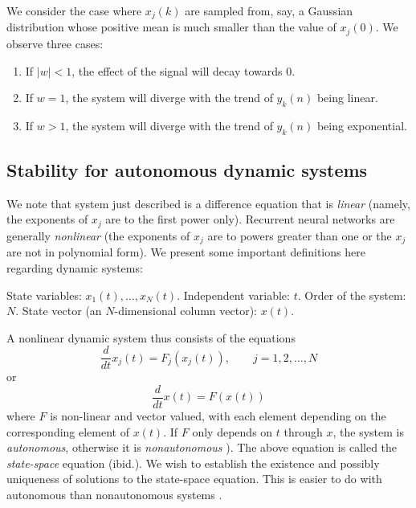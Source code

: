 We consider the case where $x_j(k)$ are sampled from, say, a Gaussian distribution whose positive mean is much smaller than the value of $x_j(0)$. We observe three cases:

\begin{enumerate}
\item If $|w| < 1$, the effect of the signal will decay towards $0$.
\item If $w = 1$, the system will diverge with the trend of $y_k(n)$ being linear.
\item If $w > 1$, the system will diverge with the trend of $y_k(n)$ being exponential.
\end{enumerate}

\subsection{Stability for autonomous dynamic systems}

We note that system just described is a difference equation that is \emph{linear} (namely, the exponents of $x_j$ are to the first power only). Recurrent neural networks are generally \emph{nonlinear} (the exponents of $x_j$ are to powers greater than one \cite[p. 6]{strogatz:2000} or the $x_j$ are not in polynomial form). We present some important definitions here regarding dynamic systems:

\begin{definition}
  State variables: $x_1(t), \ldots, x_N(t)$. Independent variable: $t$. Order of the system: $N$. State vector (an $N$-dimensional column vector): $x(t)$.
\end{definition}

A nonlinear dynamic system thus consists of the equations
%
\begin{equation*}
  \frac{d}{dt}x_j(t) = F_j \left(x_j(t)\right), \qquad j = 1, 2, \ldots, N
\end{equation*}
%
or
%
\begin{equation*}
  \frac{d}{dt}x(t) = F \left(x(t)\right)
\end{equation*}
%
where $F$ is non-linear and vector valued, with each element depending on the corresponding element of $x(t)$. If $F$ only depends on $t$ through $x$, the system is \emph{autonomous}, otherwise it is \emph{nonautonomous} \cite[p. 675]{Haykin:2009:NNC:1213811}). The above equation is called the \emph{state-space} equation (ibid.). We wish to establish the existence and possibly uniqueness of solutions to the state-space equation. This is easier to do with autonomous than nonautonomous systems \cite[p. 180]{DBLP:journals/ai/Beer95}.

